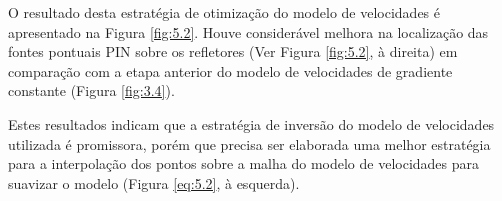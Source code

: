 O resultado desta estratégia de otimização do modelo de velocidades é apresentado na Figura \ref{fig:5.2}.
Houve considerável melhora na localização das fontes pontuais PIN sobre os refletores (Ver
Figura \ref{fig:5.2}, à direita) em comparação com a etapa anterior do modelo de velocidades de
gradiente constante (Figura \ref{fig:3.4}).

Estes resultados indicam que a estratégia de inversão do modelo de velocidades utilizada é promissora, porém
que precisa ser elaborada uma melhor estratégia para a interpolação dos pontos sobre a malha do modelo de
velocidades para suavizar o modelo (Figura \ref{eq:5.2}, à esquerda).
